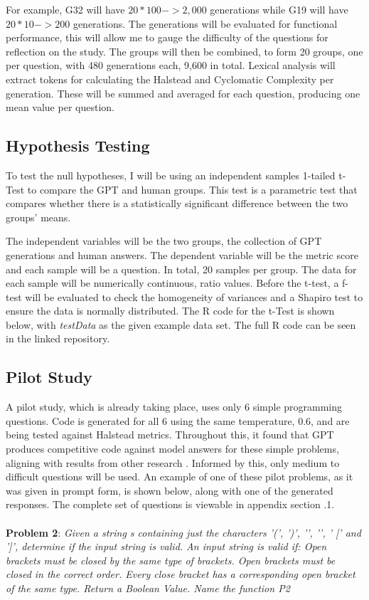 \documentclass[manuscript,screen,review,sigconf]{acmart}
\begin{document}
For example, G32 will have \(20 * 100 -> 2,000\) generations while G19 will have \(20 * 10 -> 200\) generations. The generations will be evaluated for functional performance, this will allow me to gauge the difficulty of the questions for reflection on the study. The groups will then be combined, to form 20 groups, one per question, with 480 generations each, 9,600 in total. Lexical analysis will extract tokens for calculating the Halstead and Cyclomatic Complexity per generation. These will be summed and averaged for each question, producing one mean value per question.

\subsection{Hypothesis Testing}
To test the null hypotheses, I will be using an independent samples 1-tailed t-Test to compare the GPT and human groups. This test is a parametric test that compares whether there is a statistically significant difference between the two groups' means.

The independent variables will be the two groups, the collection of GPT generations and human answers. The dependent variable will be the metric score and each sample will be a question. In total, 20 samples per group. The data for each sample will be numerically continuous, ratio values. Before the t-test, a f-test will be evaluated to check the homogeneity of variances and a Shapiro test to ensure the data is normally distributed. The R code for the t-Test is shown below, with \textit{testData} as the given example data set. The full R code can be seen in the linked repository.

\subsection{Pilot Study}
A pilot study, which is already taking place, uses only 6 simple programming questions. Code is generated for all 6 using the same temperature, 0.6, and are being tested against Halstead metrics. Throughout this, it found that GPT produces competitive code against model answers for these simple problems, aligning with results from other research \cite{Codex_CS1_CS2_Test}. Informed by this, only medium to difficult questions will be used. An example of one of these pilot problems, as it was given in prompt form, is shown below, along with one of the generated responses. The complete set of questions is viewable in appendix section .1.
\\ \\
\textbf{Problem 2}: \textit{Given a string s containing just the characters '(', ')', '{', '}', ' [' and ']', determine if the input string is valid. An input string is valid if: Open brackets must be closed by the same type of brackets. Open brackets must be closed in the correct order. Every close bracket has a corresponding open bracket of the same type. Return a Boolean Value. Name the function P2}
\end{document}
